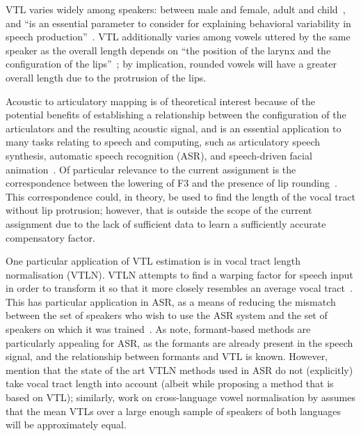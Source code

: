 \documentclass[11pt]{article}
\begin{document}
VTL varies widely among speakers: between male and female, adult and child~\citep[p. 119]{rodriguez2010line}, and ``is an essential parameter to consider for explaining behavioral variability in speech production''~\citep[p. 1]{lammert2015short}. VTL additionally varies among vowels uttered by the same speaker as the overall length depends on ``the position of the larynx and the configuration of the lips''~\citep[p. 25]{johnson2003acoustic}; by implication, rounded vowels will have a greater overall length due to the protrusion of the lips.

Acoustic to articulatory mapping is of theoretical interest because of the potential benefits of establishing a relationship between the configuration of the articulators and the resulting acoustic signal, and is an essential application to many tasks relating to speech and computing, such as articulatory speech synthesis, automatic speech recognition (ASR), and speech-driven facial animation~\citep{samer2010acoustic}. Of particular relevance to the current assignment is the correspondence between the lowering of F3 and the presence of lip rounding~\citep[p. 143]{maeda1990compensatory}. This correspondence could, in theory, be used to find the length of the vocal tract without lip protrusion; however, that is outside the scope of the current assignment due to the lack of sufficient data to learn a sufficiently accurate compensatory factor.

One particular application of VTL estimation is in vocal tract length normalisation (VTLN). VTLN attempts to find a warping factor for speech input in order to transform it so that it more closely resembles an average vocal tract~\citep{saheer2010implementation}. This has particular application in ASR, as a means of reducing the mismatch between the set of speakers who wish to use the ASR system and the set of speakers on which it was trained~\citep[p. 121]{rodriguez2010line}. As \citet[p. 2]{lammert2015short} note, formant-based methods are particularly appealing for ASR, as the formants are already present in the speech signal, and the relationship between formants and VTL is known. However, \citet[p. 121]{rodriguez2010line} mention that the state of the art VTLN methods used in ASR do not (explicitly) take vocal tract length into account (albeit while proposing a method that is based on VTL); similarly, work on cross-language vowel normalisation by \citet{morrison2006cross} assumes that the mean VTLs over a large enough sample of speakers of both languages will be approximately equal.
\end{document}
